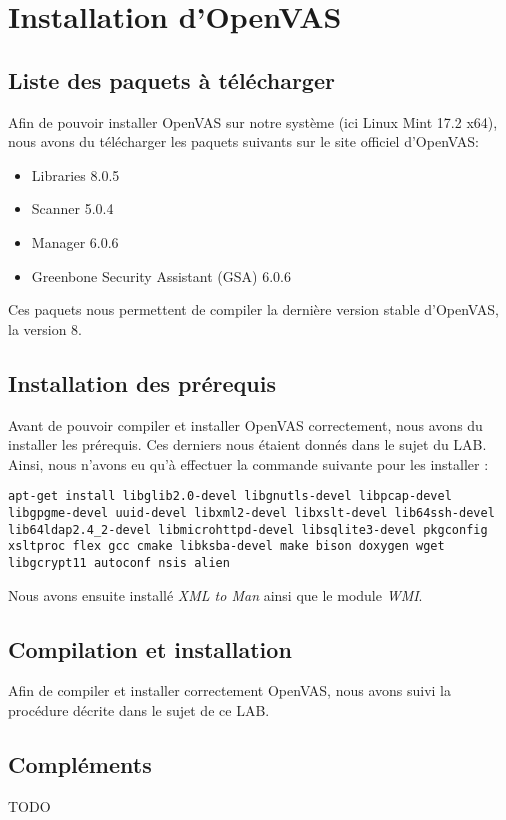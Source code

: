 \section{Installation d'OpenVAS}
\subsection{Liste des paquets à télécharger}
Afin de pouvoir installer OpenVAS sur notre système (ici Linux Mint 17.2 x64), nous avons du télécharger les paquets suivants sur le site officiel d'OpenVAS\cite{OVDL}:
\begin{itemize}
 \item Libraries 8.0.5
 \item Scanner 5.0.4
 \item Manager 6.0.6
 \item Greenbone Security Assistant (GSA) 6.0.6
\end{itemize}
Ces paquets nous permettent de compiler la dernière version stable d'OpenVAS, la version 8.
\subsection{Installation des prérequis}
Avant de pouvoir compiler et installer OpenVAS correctement, nous avons du installer les prérequis. Ces derniers nous étaient donnés dans le sujet du LAB. Ainsi, nous n'avons eu qu'à effectuer la commande suivante pour les installer :
\begin{lstlisting}[style=custombash]
apt-get install libglib2.0-devel libgnutls-devel libpcap-devel libgpgme-devel uuid-devel libxml2-devel libxslt-devel lib64ssh-devel lib64ldap2.4_2-devel libmicrohttpd-devel libsqlite3-devel pkgconfig xsltproc flex gcc cmake libksba-devel make bison doxygen wget libgcrypt11 autoconf nsis alien
\end{lstlisting}
Nous avons ensuite installé \textit{XML to Man} ainsi que le module \textit{WMI}.
\subsection{Compilation et installation}
Afin de compiler et installer correctement OpenVAS, nous avons suivi la procédure décrite dans le sujet de ce LAB.
\subsection{Compléments}
TODO